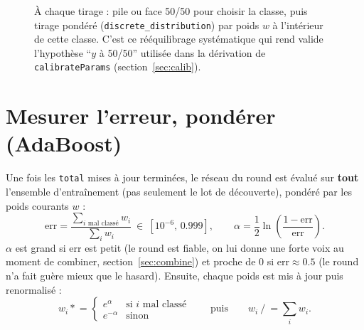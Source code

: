 \documentclass[12pt,a4paper]{article}
\newcommand{\code}[1]{\texttt{#1}}
\theoremstyle{remark}
\begin{document}
\begin{figure}[h]
\centering
{}
\caption{À chaque tirage : pile ou face 50/50 pour choisir la classe, puis
tirage pondéré (\code{discrete\_distribution}) par poids $w$ à l'intérieur de
cette classe. C'est ce rééquilibrage systématique qui rend valide l'hypothèse
``$y$ à 50/50'' utilisée dans la dérivation de \code{calibrateParams}
(section~\ref{sec:calib}).}
\label{fig:sampler}
\end{figure}

\section{Mesurer l'erreur, pondérer (AdaBoost)}

Une fois les \code{total} mises à jour terminées, le réseau du round est évalué
sur \textbf{tout} l'ensemble d'entraînement (pas seulement le lot de découverte),
pondéré par les poids courants $w$ :
\[
  \mathrm{err} = \frac{\displaystyle\sum_{i \text{ mal classé}} w_i}{\displaystyle\sum_i w_i}
  \ \in\ [10^{-6},\,0.999],
  \qquad
  \alpha = \frac12\ln\!\left(\frac{1-\mathrm{err}}{\mathrm{err}}\right).
\]
$\alpha$ est grand si $\mathrm{err}$ est petit (le round est fiable, on lui donne
une forte voix au moment de combiner, section~\ref{sec:combine}) et proche de $0$
si $\mathrm{err}\approx0.5$ (le round n'a fait guère mieux que le hasard).
Ensuite, chaque poids est mis à jour puis renormalisé :
\[
  w_i \mathrel{*}= \begin{cases} e^{\alpha} & \text{si } i \text{ mal classé} \\ e^{-\alpha} & \text{sinon}\end{cases}
  \qquad\text{puis}\qquad w_i \mathrel{/}= \textstyle\sum_i w_i.
\]
\end{document}
